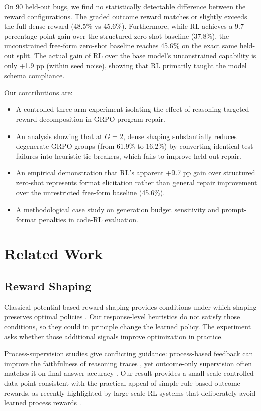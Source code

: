 \documentclass{article}
\begin{document}
On 90 held-out bugs, we find no statistically detectable difference between the reward configurations. The graded outcome reward matches or slightly exceeds the full dense reward (48.5\% vs 45.6\%). Furthermore, while RL achieves a 9.7 percentage point gain over the structured zero-shot baseline (37.8\%), the unconstrained free-form zero-shot baseline reaches 45.6\% on the exact same held-out split. The actual gain of RL over the base model's unconstrained capability is only +1.9 pp (within seed noise), showing that RL primarily taught the model schema compliance.

Our contributions are:
\begin{itemize}
\item A controlled three-arm experiment isolating the effect of reasoning-targeted reward decomposition in GRPO program repair.
\item An analysis showing that at $G=2$, dense shaping substantially reduces degenerate GRPO groups (from 61.9\% to 16.2\%) by converting identical test failures into heuristic tie-breakers, which fails to improve held-out repair.
\item An empirical demonstration that RL's apparent +9.7 pp gain over structured zero-shot represents format elicitation rather than general repair improvement over the unrestricted free-form baseline (45.6\%).
\item A methodological case study on generation budget sensitivity and prompt-format penalties in code-RL evaluation.
\end{itemize}

\section{Related Work}

\subsection{Reward Shaping}
Classical potential-based reward shaping provides conditions under which shaping preserves optimal policies \cite{Ng1999}. Our response-level heuristics do not satisfy those conditions, so they could in principle change the learned policy. The experiment asks whether those additional signals improve optimization in practice.

Process-supervision studies give conflicting guidance: process-based feedback can improve the faithfulness of reasoning traces \cite{Lightman2023}, yet outcome-only supervision often matches it on final-answer accuracy \cite{Uesato2022}. Our result provides a small-scale controlled data point consistent with the practical appeal of simple rule-based outcome rewards, as recently highlighted by large-scale RL systems that deliberately avoid learned process rewards \cite{Guo2025}.
\end{document}
